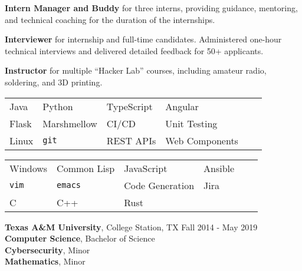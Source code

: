\documentclass[12pt]{article}
\begin{document}
\begin{flushleft}
\begin{outline}[compactitem]
          \vspace{0.25em}\textbf{Intern Manager and Buddy} for three interns, providing guidance, mentoring, and technical coaching for the duration of the internships.

          \vspace{0.25em}\textbf{Interviewer} for internship and full-time candidates.
          Administered one-hour technical interviews and delivered detailed feedback for 50+ applicants.

          \vspace{0.25em}\textbf{Instructor} for multiple ``Hacker Lab'' courses, including amateur radio, soldering, and 3D printing.

        \vspace{.25em}
          \vspace{.25em}
          \hspace{0.05\textwidth}\begin{tabularx}{0.9\textwidth}{X X X X X X}
            Java   & Python      & TypeScript  & Angular \\
            Flask  & Marshmellow & CI/CD       & Unit Testing \\
            Linux  & \verb|git|  & REST APIs  & Web Components \\
          \end{tabularx}
          \vspace{.25em}

        \vspace{.25em}
          \vspace{.25em}
          \hspace{0.05\textwidth}\begin{tabularx}{0.9\textwidth}{X X X X X X}
            Windows  & Common Lisp  & JavaScript  & Ansible \\
            \verb|vim| & \verb|emacs| & Code Generation & Jira \\
            C & C++ & Rust
          \end{tabularx}
          \vspace{.25em}

        \1 \textbf{Texas A\&M University}, College Station, TX \hfill Fall 2014 - May 2019
        \\ \textbf{Computer Science}, Bachelor of Science
        \\ \textbf{Cybersecurity}, Minor
        \\ \textbf{Mathematics}, Minor
    \end{outline}
\end{flushleft}
\end{document}
